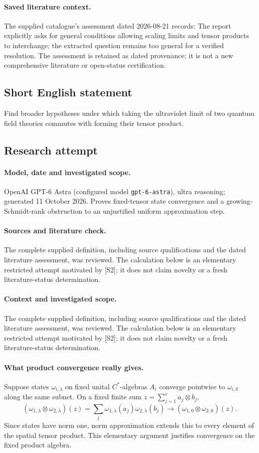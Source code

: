\documentclass[11pt]{article}
\begin{document}
\paragraph{Saved literature context.} The supplied catalogue's assessment dated 2026-08-21 records: The report explicitly asks for general conditions allowing scaling limits and tensor products to interchange; the extracted question remains too general for a verified resolution. The assessment is retained as dated provenance; it is not a new comprehensive literature or open-status certification.
\subsection{Short English statement}
Find broader hypotheses under which taking the ultraviolet limit of two quantum field theories commutes with forming their tensor product.
\subsection{Research attempt}
\paragraph{Model, date and investigated scope.}
OpenAI GPT-6 Astra (configured model \texttt{gpt-6-astra}), ultra reasoning; generated 11 October 2026. Proves fixed-tensor state convergence and a growing-Schmidt-rank obstruction to an unjustified uniform approximation step.

\paragraph{Sources and literature check.}
The complete supplied definition, including source qualifications and the dated literature assessment, was reviewed. The calculation below is an elementary restricted attempt motivated by [S2]; it does not claim novelty or a fresh literature-status determination.

\paragraph{Context and investigated scope.} The complete supplied definition, including source qualifications and the dated literature assessment, was reviewed. The calculation below is an elementary restricted attempt motivated by [S2]; it does not claim novelty or a fresh literature-status determination.

\paragraph{What product convergence really gives.} Suppose states $\omega_{i,\lambda}$ on fixed unital $C^*$-algebras $A_i$ converge pointwise to $\omega_{i,0}$ along the same subnet. On a fixed finite sum $z=\sum_{j=1}^r a_j\otimes b_j$,
\[
 (\omega_{1,\lambda}\otimes\omega_{2,\lambda})(z)
 =\sum_j\omega_{1,\lambda}(a_j)\omega_{2,\lambda}(b_j)
 \longrightarrow(\omega_{1,0}\otimes\omega_{2,0})(z).
\]
Since states have norm one, norm approximation extends this to every element of the spatial tensor product. This elementary argument justifies convergence on the fixed product algebra.
\end{document}
